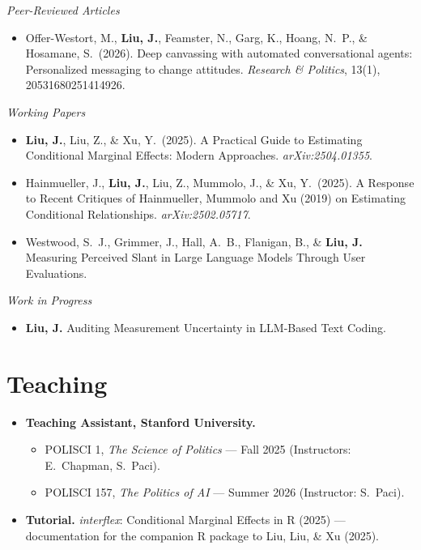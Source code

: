 \documentclass[letterpaper,10.5pt]{article}
\newcommand{\resumeSubHeadingListStart}{\begin{itemize}[leftmargin=0.15in, label={}]}
\newcommand{\resumeSubHeadingListEnd}{\end{itemize}}
\begin{document}
  \textit{\small Peer-Reviewed Articles}
  \resumeSubHeadingListStart
    \small\item Offer-Westort, M., \textbf{Liu, J.}, Feamster, N., Garg, K., Hoang, N.\ P., \& Hosamane, S.\ (2026). Deep canvassing with automated conversational agents: Personalized messaging to change attitudes. \textit{Research \& Politics}, 13(1), 20531680251414926.
  \resumeSubHeadingListEnd

  \vspace{2pt}
  \textit{\small Working Papers}
  \resumeSubHeadingListStart
    \small\item \textbf{Liu, J.}, Liu, Z., \& Xu, Y.\ (2025). A Practical Guide to Estimating Conditional Marginal Effects: Modern Approaches. \textit{arXiv:2504.01355}.
    \small\item Hainmueller, J., \textbf{Liu, J.}, Liu, Z., Mummolo, J., \& Xu, Y.\ (2025). A Response to Recent Critiques of Hainmueller, Mummolo and Xu (2019) on Estimating Conditional Relationships. \textit{arXiv:2502.05717}.
    \small\item Westwood, S.\ J., Grimmer, J., Hall, A.\ B., Flanigan, B., \& \textbf{Liu, J.} Measuring Perceived Slant in Large Language Models Through User Evaluations.
  \resumeSubHeadingListEnd

  \vspace{2pt}
  \textit{\small Work in Progress}
  \resumeSubHeadingListStart
    \small\item \textbf{Liu, J.} Auditing Measurement Uncertainty in LLM-Based Text Coding.
  \resumeSubHeadingListEnd



\section{Teaching}
  \vspace{1pt}
  \resumeSubHeadingListStart
    \small\item \textbf{Teaching Assistant, Stanford University.}
      \begin{itemize}[leftmargin=0.25in, itemsep=-1pt]
        \small\item POLISCI 1, \textit{The Science of Politics} --- Fall 2025 (Instructors: E.\ Chapman, S.\ Paci).
        \small\item POLISCI 157, \textit{The Politics of AI} --- Summer 2026 (Instructor: S.\ Paci).
      \end{itemize}
    \vspace{1pt}
    \small\item \textbf{Tutorial.} \textit{interflex}: Conditional Marginal Effects in R (2025) --- documentation for the companion R package to Liu, Liu, \& Xu (2025).
  \resumeSubHeadingListEnd
\end{document}
